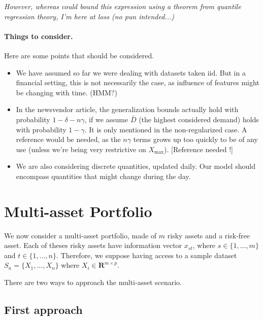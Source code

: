 \documentclass[11pt]{article}
\newcommand{\real}{\bm R}
\theoremstyle{plain}
\theoremstyle{definition}
\begin{document}
\textit{However, whereas \cite{rudin2015} could bound this expression using a theorem from
  quantile regression theory, I'm here at loss (no pun intended...)}





\paragraph{Things to consider.}

Here are some points that should be considered.

\begin{itemize}
\item We have assumed so far we were dealing with datasets taken iid. But in a financial
  setting, this is not necessarily the case, as influence of features might be changing
  with time. (HMM?)
\item In the newsvendor article, the generalization bounds actually hold with probability
  $1-\delta - n\gamma$, if we assume $\bar D$ (the highest considered demand) holds with
  probability $1-\gamma$. It is only mentioned in the non-regularized case. A reference
  would be needed, as the $n\gamma$ terms grows up too quickly to be of any use (unless
  we're being very restrictive on $X_{\max}$). [Reference needed !]
\item We are also considering discrete quantities, updated daily. Our model should
  encompass quantities that might change during the day.
\end{itemize}




\section{Multi-asset Portfolio}

We now consider a multi-asset portfolio, made of $m$ risky assets and a risk-free
asset. Each of theses risky assets have information vector $x_{st}$, where
$s\in\{1,\ldots,m\}$ and $t\in\{1,\ldots,n\}$. Therefore, we suppose having access to a
sample dataset $S_n = \{X_1,\ldots,X_n\}$ where $X_i\in\real^{m\times p}$.

There are two ways to approach the multi-asset scenario. 


\subsection{First approach}
\end{document}
